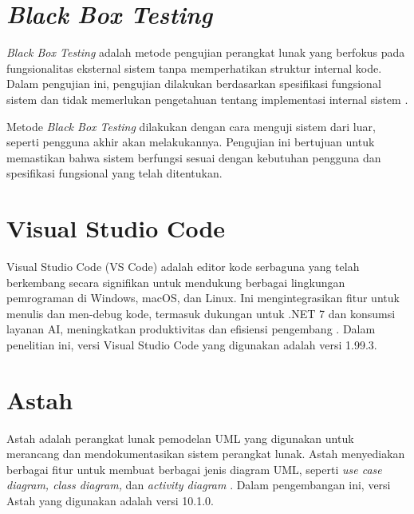 
\section{\textit{Black Box Testing}}
\textit{Black Box Testing} adalah metode pengujian perangkat lunak yang berfokus pada fungsionalitas eksternal sistem tanpa memperhatikan struktur internal kode. Dalam pengujian ini, pengujian dilakukan berdasarkan spesifikasi fungsional sistem dan tidak memerlukan pengetahuan tentang implementasi internal sistem \cite{henard2016comparing}.

Metode \textit{Black Box Testing} dilakukan dengan cara menguji sistem dari luar, seperti pengguna akhir akan melakukannya. Pengujian ini bertujuan untuk memastikan bahwa sistem berfungsi sesuai dengan kebutuhan pengguna dan spesifikasi fungsional yang telah ditentukan.

\section{Visual Studio Code}
Visual Studio Code (VS Code) adalah editor kode serbaguna yang telah berkembang secara signifikan untuk mendukung berbagai lingkungan pemrograman di Windows, macOS, dan Linux. Ini mengintegrasikan fitur untuk menulis dan men-debug kode, termasuk dukungan untuk .NET 7 dan konsumsi layanan AI, meningkatkan produktivitas dan efisiensi pengembang \cite{bree2016using}. Dalam penelitian ini, versi Visual Studio Code yang digunakan adalah versi 1.99.3.


\section{Astah}
Astah adalah perangkat lunak pemodelan UML yang digunakan untuk merancang dan mendokumentasikan sistem perangkat lunak. Astah menyediakan berbagai fitur untuk membuat berbagai jenis diagram UML, seperti \textit{use case diagram, class diagram,} dan \textit{activity diagram} \cite{hayati2021sistem}. Dalam pengembangan ini, versi Astah yang digunakan adalah versi 10.1.0.

